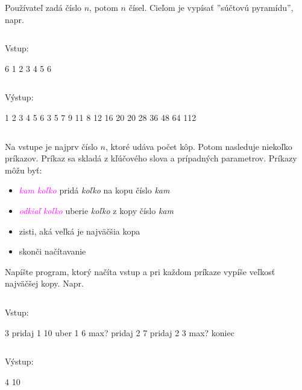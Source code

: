 \begin{uloha}
  Používateľ zadá číslo $n$, potom $n$ čísel.
  Cieľom je vypísať ''súčtovú pyramídu'',
napr.\\

\begin{column}{0.45}
Vstup:\\
\begin{outputBox}
6
1 2 3 4 5 6
\end{outputBox}
\end{column}
\hfill
\begin{column}{0.45}
Výstup:\\
\begin{outputBox}
1 2 3 4 5 6
3 5 7 9 11
8 12 16 20
20 28 36
48 64
112
\end{outputBox}
\end{column}
\end{uloha}


\begin{uloha}
  Na vstupe je najprv číslo $n$, ktoré udáva počet kôp. Potom nasleduje
  niekoľko príkazov. Príkaz sa skladá z kľúčového slova a prípadných parametrov.
  Príkazy môžu byť:

\begin{itemize}\itemsep=-1mm
    \item \textcolor{magenta}{ {\em kam koľko}} 
      pridá {\em koľko} na kopu číslo {\em kam}
    \item \textcolor{magenta}{ {\em odkiaľ koľko}}
      uberie {\em koľko} z kopy číslo {\em kam}
    \item \textcolor{magenta}{}
      zisti, aká veľká je najväčšia kopa
    \item \textcolor{magenta}{}
      skonči načítavanie
\end{itemize}

  Napíšte program, ktorý načíta vstup a pri každom príkaze 
  vypíše veľkosť najväčšej kopy. Napr. 

\begin{column}{0.45}
Vstup:\\
\begin{outputBox}
3
pridaj 1 10
uber 1 6
max?
pridaj 2 7
pridaj 2 3
max?
koniec
\end{outputBox}
\end{column}
\hfill
\begin{column}{0.45}
Výstup:\\
\begin{outputBox}
4
10
\end{outputBox}
\end{column}
\end{uloha}

